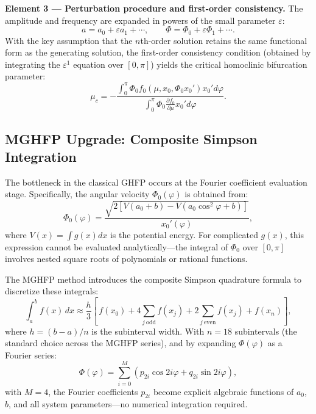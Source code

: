 \documentclass[11pt,a4paper]{article}
\begin{document}
\medskip
\noindent\textbf{Element 3 --- Perturbation procedure and first-order consistency.}
The amplitude and frequency are expanded in powers of the small parameter $\varepsilon$:
\begin{equation}
a = a_0 + \varepsilon a_1 + \cdots, \qquad \Phi = \Phi_0 + \varepsilon\Phi_1 + \cdots.
\label{eq:expansion}
\end{equation}
With the key assumption that the $n$th-order solution retains the same functional form as the generating solution, the first-order consistency condition (obtained by integrating the $\varepsilon^1$ equation over $[0, \pi]$) yields the critical homoclinic bifurcation parameter:
\begin{equation}
\boxed{\mu_c = -\frac{\int_0^\pi \Phi_0 f_0(\mu, x_0, \Phi_0 x_0') x_0' d\varphi}{\int_0^\pi \Phi_0 \frac{\partial f_0}{\partial \mu} x_0' d\varphi}}.
\label{eq:mu_c_ghfp}
\end{equation}

\subsection{MGHFP Upgrade: Composite Simpson Integration}

The bottleneck in the classical GHFP occurs at the Fourier coefficient evaluation stage. Specifically, the angular velocity $\Phi_0(\varphi)$ is obtained from:
\begin{equation}
\Phi_0(\varphi) = \frac{\sqrt{2[V(a_0+b) - V(a_0\cos^2\varphi + b)]}}{x_0'(\varphi)},
\label{eq:Phi0}
\end{equation}
where $V(x) = \int g(x)dx$ is the potential energy. For complicated $g(x)$, this expression cannot be evaluated analytically---the integral of $\Phi_0$ over $[0, \pi]$ involves nested square roots of polynomials or rational functions.

The MGHFP method introduces the composite Simpson quadrature formula to discretize these integrals:
\begin{equation}
\int_a^b f(x)\,dx \approx \frac{h}{3}\left[\,f(x_0) + 4\sum_{j\ \text{odd}} f(x_j) + 2\sum_{j\ \text{even}} f(x_j) + f(x_n)\right],
\label{eq:simpson}
\end{equation}
where $h = (b-a)/n$ is the subinterval width. With $n = 18$ subintervals (the standard choice across the MGHFP series), and by expanding $\Phi(\varphi)$ as a Fourier series:
\begin{equation}
\Phi(\varphi) = \sum_{i=0}^{M} (p_{2i}\cos 2i\varphi + q_{2i}\sin 2i\varphi),
\end{equation}
with $M = 4$, the Fourier coefficients $p_{2i}$ become explicit algebraic functions of $a_0$, $b$, and all system parameters---no numerical integration required.
\end{document}
